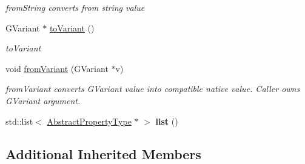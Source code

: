 \begin{DoxyCompactItemize}
\begin{DoxyCompactList}\small\item\em from\-String converts from string value \end{DoxyCompactList}\item 
G\-Variant $\ast$ \hyperlink{classListPropertyType_ab0a0e192757158cd9901becacbafdb41}{to\-Variant} ()
\begin{DoxyCompactList}\small\item\em to\-Variant \end{DoxyCompactList}\item 
void \hyperlink{classListPropertyType_aa76b2385816ce8a12982109d632b6b93}{from\-Variant} (G\-Variant $\ast$v)
\begin{DoxyCompactList}\small\item\em from\-Variant converts G\-Variant value into compatible native value. Caller owns G\-Variant argument. \end{DoxyCompactList}\item 
\hypertarget{classListPropertyType_a764a0d0ab730b7821514d7158e1df05b}{std\-::list$<$ \hyperlink{classAbstractPropertyType}{Abstract\-Property\-Type} $\ast$ $>$ {\bfseries list} ()}\label{classListPropertyType_a764a0d0ab730b7821514d7158e1df05b}

\end{DoxyCompactItemize}
\subsection*{Additional Inherited Members}


